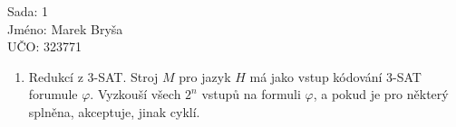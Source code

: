 \documentclass[a4wide,12pt]{extarticle}
\begin{document}
\begin{flushleft}
Sada: 1 \\ 
Jméno: Marek Bryša \\
UČO: 323771\\
\end{flushleft}
\begin{enumerate}
  \item
		Redukcí z 3-SAT. Stroj $M$ pro jazyk $H$ má jako vstup kódování 3-SAT forumule $\varphi$. Vyzkouší všech $2^n$ vstupů na formuli $\varphi$, a pokud je pro některý splněna, akceptuje, jinak cyklí. 
\end{enumerate}
\end{document}
